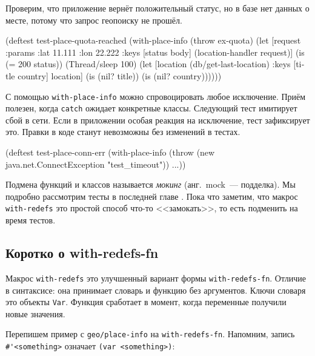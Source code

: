\noindent
Проверим, что приложение вернёт положительный статус, но в базе нет данных о
месте, потому что запрос геопоиску не прошёл.

\begin{english}
  \begin{clojure}
(deftest test-place-quota-reached
  (with-place-info (throw ex-quota)
    (let [request {:params {:lat 11.111 :lon 22.222}}
          {:keys [status body]} (location-handler request)]
      (is (= 200 status))
      (Thread/sleep 100)
      (let [location (db/get-last-location)
            {:keys [title country]} location]
        (is (nil? title))
        (is (nil? country))))))
  \end{clojure}
\end{english}

С помощью \verb|with-place-info| можно спровоцировать любое исключение. Приём
полезен, когда \verb|catch| ожидает конкретные классы. Следующий тест имитирует
сбой в сети. Если в приложении особая реакция на исключение, тест зафиксирует
это. Правки в коде станут невозможны без изменений в тестах.


\begin{english}
  \begin{clojure}
(deftest test-place-conn-err
  (with-place-info
    (throw (new java.net.ConnectException "test_timeout"))
    ...))
  \end{clojure}
\end{english}


Подмена функций и классов называется \emph{мокинг} (анг.~mock~--- подделка). Мы
подробно рассмотрим тесты в последней главе . Пока что
заметим, что макрос \verb|with-redefs| это простой способ что-то <<замокать>>,
то есть подменить на время тестов.

\subsection{Коротко о with-redefs-fn}


Макрос \verb|with-redefs| это улучшенный вариант формы
\verb|with-redefs-fn|. Отличие в синтаксисе: она принимает словарь и функцию без
аргументов. Ключи словаря это объекты \verb|Var|. Функция сработает в момент,
когда переменные получили новые значения.

Перепишем пример с \verb|geo/place-info| на \verb|with-redefs-fn|. Напомним,
запись \verb|#'<something>| означает \verb|(var <something>)|:

